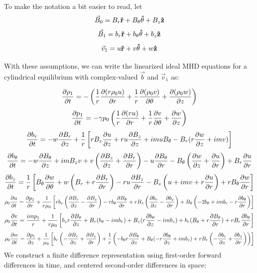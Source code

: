 \documentclass[%
 reprint,
 amsmath,amssymb,
 aps,
]{revtex4-2}
\begin{document}
To make the notation a bit easier to read, let
\begin{equation}
\vec B_0 = B_r \vu r + B_\theta \vu \theta + B_z \vu z
\end{equation}
\begin{equation}
\vec B_1 = b_r \vu r + b_\theta \vu \theta + b_z \vu z
\end{equation}
\begin{equation}
\vec v_1 = u \vu r + v \vu \theta + w \vu z
\end{equation}

With these assumptions, we can write the linearized ideal MHD equations for a cylindrical equilibrium with complex-valued $\vec b$ and $\vec v_1$ as:

\begin{equation}
\pdv{\rho_1}{t} = - \left( \frac{1}{r} \pdv{( r \rho_0 u)}{r} + \frac{1}{r} \pdv{(\rho_0 v)}{\theta} + \pdv{(\rho_0 w)}{z} \right)
\end{equation}
\begin{equation}
\pdv{p_1}{t} = - \gamma p_0 \left( \frac{1}{r} \pdv{(r u)}{r} + \frac{1}{r} \pdv{v}{\theta}  + \pdv{w}{z}  \right)
\end{equation}
\begin{equation}
\pdv{b_r}{t} = - w \pdv{B_r}{z} + \frac{1}{r} \left[ r B_z \pdv{u}{z} + r u \pdv{B_z}{z} + i m u B_\theta - B_r (r \pdv{w}{z} + i m v) \right]
\end{equation}
\begin{equation}
\pdv{b_\theta}{t} = - w \pdv{B_\theta}{z} + i m B_z v + v \left( \pdv{B_z}{z} + \pdv{B_r}{r} \right) - u \pdv{B_\theta}{r} - B_\theta \left( \pdv{w}{z} + \pdv{u}{r} \right) + B_r \pdv{u}{r}
\end{equation}
\begin{equation}
\pdv{b_z}{t} = \frac{1}{r} \left[ B_\theta \pdv{w}{\theta} + w \left(B_r + r \pdv{B_r}{r} \right) - r u \pdv{B_z}{r} - B_z \left(u + imv + r \pdv{u}{r} \right) + r B_\theta \pdv{w}{r} \right]
\end{equation}
\begin{equation}
\rho_0 \pdv{u}{t} = \pdv{p_1}{r} + \frac{1}{r \mu_0} \left[ r b_z \left( \pdv{B_r}{z} - \pdv{B_z}{r} \right) - r b_\theta \pdv{B_\theta}{r} + r B_z \left( \pdv{b_r}{z} - \pdv{b_z}{r} \right) + B_\theta \left( -2 b_\theta + i m b_r - r \pdv{b_\theta}{r} \right) \right]
\end{equation}
\begin{equation}
\rho_0 \pdv{v}{t} = \frac{i m p_1}{r} + \frac{1}{r \mu_0} \left[ b_z r \pdv{B_\theta}{z} + B_r (b_\theta - i m b_r) + B_z (r \pdv{b_\theta}{z} - i m b_z) + b_r(B_\theta + r \pdv{B_\theta}{r}) + r B_r \pdv{b_\theta}{r} \right]
\end{equation}
\begin{equation}
\rho_0 \pdv{w}{t} = \pdv{p_1}{z} + \frac{1}{\mu_0} \left[ b_r \left( - \pdv{B_r}{z} + \pdv{B_z}{r} \right) + \frac{1}{r} \left( -b_\theta r \pdv{B_\theta}{z} + B_\theta (- r \pdv{b_\theta}{z} + i m b_z) + r B_r \left(- \pdv{b_r}{z} + \pdv{b_z}{r} \right) \right)  \right]
\end{equation}
We construct a finite difference representation using first-order forward differences in time, and centered second-order differences in space:
\end{document}
